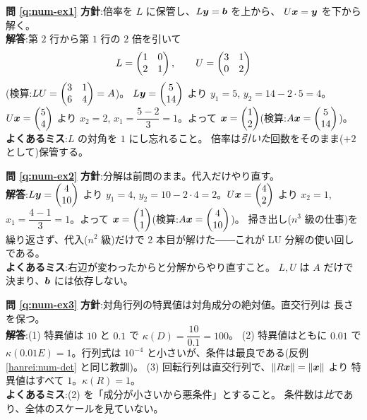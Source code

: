 \bigskip
\noindent\textbf{問 \ref{q:num-ex1}}\quad
\textbf{方針}:倍率を $L$ に保管し、$L\bm{y} = \bm{b}$ を上から、
$U\bm{x} = \bm{y}$ を下から解く。\\
\textbf{解答}:第 $2$ 行から第 $1$ 行の $2$ 倍を引いて
\[
L = \begin{pmatrix}1 & 0 \\ 2 & 1\end{pmatrix}, \qquad U = \begin{pmatrix}3 & 1 \\ 0 & 2\end{pmatrix}
\]
(検算:$LU = \begin{pmatrix}3 & 1 \\ 6 & 4\end{pmatrix} = A$)。
$L\bm{y} = \begin{pmatrix}5 \\ 14\end{pmatrix}$ より $y_1 = 5$,
$y_2 = 14 - 2 \cdot 5 = 4$。$U\bm{x} = \begin{pmatrix}5 \\ 4\end{pmatrix}$ より
$x_2 = 2$, $x_1 = \dfrac{5 - 2}{3} = 1$。よって
$\bm{x} = \begin{pmatrix}1 \\ 2\end{pmatrix}$(検算:$A\bm{x} = \begin{pmatrix}5 \\ 14\end{pmatrix}$)。\\
\textbf{よくあるミス}:$L$ の対角を $1$ にし忘れること。
倍率は\emph{引いた}回数をそのまま($+2$ として)保管する。

\bigskip
\noindent\textbf{問 \ref{q:num-ex2}}\quad
\textbf{方針}:分解は前問のまま。代入だけやり直す。\\
\textbf{解答}:$L\bm{y} = \begin{pmatrix}4 \\ 10\end{pmatrix}$ より $y_1 = 4$,
$y_2 = 10 - 2 \cdot 4 = 2$。$U\bm{x} = \begin{pmatrix}4 \\ 2\end{pmatrix}$ より
$x_2 = 1$, $x_1 = \dfrac{4 - 1}{3} = 1$。よって
$\bm{x} = \begin{pmatrix}1 \\ 1\end{pmatrix}$(検算:$A\bm{x} = \begin{pmatrix}4 \\ 10\end{pmatrix}$)。
掃き出し($n^3$ 級の仕事)を繰り返さず、代入($n^2$ 級)だけで
$2$ 本目が解けた――これが LU 分解の使い回しである。\\
\textbf{よくあるミス}:右辺が変わったからと分解からやり直すこと。
$L, U$ は $A$ だけで決まり、$\bm{b}$ には依存しない。

\bigskip
\noindent\textbf{問 \ref{q:num-ex3}}\quad
\textbf{方針}:対角行列の特異値は対角成分の絶対値。直交行列は
長さを保つ。\\
\textbf{解答}:(1) 特異値は $10$ と $0.1$ で
$\kappa(D) = \dfrac{10}{0.1} = 100$。
(2) 特異値はともに $0.01$ で $\kappa(0.01E) = 1$。行列式は
$10^{-4}$ と小さいが、条件は最良である(反例 \ref{hanrei:num-det}
と同じ教訓)。
(3) 回転行列は直交行列で、$\|R\bm{x}\| = \|\bm{x}\|$ より
特異値はすべて $1$。$\kappa(R) = 1$。\\
\textbf{よくあるミス}:(2) を「成分が小さいから悪条件」とすること。
条件数は\emph{比}であり、全体のスケールを見ていない。

